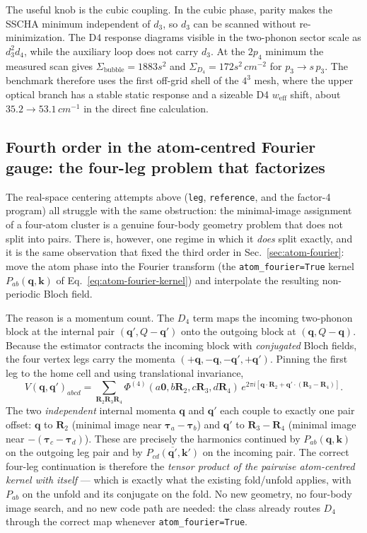 \documentclass[11pt,a4paper]{article}
\newcommand{\qv}{\mathbf{q}}
\newcommand{\kv}{\mathbf{k}}
\newcommand{\Rv}{\mathbf{R}}
\begin{document}
The useful knob is the cubic coupling.  In the cubic phase, parity makes
the SSCHA minimum independent of $d_3$, so $d_3$ can be scanned without
re-minimization.  The D4 response diagrams visible in the two-phonon sector
scale as $d_3^2d_4$, while the auxiliary loop does not carry $d_3$.  At the
$2p_4$ minimum the measured scan gives
$\Sigma_{\mathrm{bubble}}=1883s^2$ and
$\Sigma_{D_4}=172s^2\,\si{cm^{-2}}$ for $p_3\to s\,p_3$.  The benchmark
therefore uses the first off-grid shell of the $4^3$ mesh, where the upper
optical branch has a stable static response and a sizeable D4
$w_{\mathrm{eff}}$ shift, about $35.2\to53.1\,\si{cm^{-1}}$ in the direct
fine calculation.

\subsection{Fourth order in the atom-centred Fourier gauge: the four-leg
problem that factorizes}
\label{sec:d4-atom-fourier}

The real-space centering attempts above (\texttt{leg}, \texttt{reference},
and the factor-4 program) all struggle with the same obstruction: the
minimal-image assignment of a four-atom cluster is a genuine four-body
geometry problem that does not split into pairs.  There is, however, one
regime in which it \emph{does} split exactly, and it is the same
observation that fixed the third order in Sec.~\ref{sec:atom-fourier}:
move the atom phase into the Fourier transform (the
\texttt{atom\_fourier=True} kernel $P_{ab}(\qv,\kv)$ of
Eq.~\eqref{eq:atom-fourier-kernel}) and interpolate the resulting
non-periodic Bloch field.

The reason is a momentum count.  The $D_4$ term maps the incoming
two-phonon block at the internal pair $(\qv',Q-\qv')$ onto the outgoing
block at $(\qv,Q-\qv)$.  Because the estimator contracts the incoming
block with \emph{conjugated} Bloch fields, the four vertex legs carry the
momenta $(+\qv,-\qv,-\qv',+\qv')$.  Pinning the first leg to the home cell
and using translational invariance,
\begin{equation}
V(\qv,\qv')_{abcd}
= \sum_{\Rv_2\Rv_3\Rv_4}
\Phi^{(4)}(a\mathbf 0,b\Rv_2,c\Rv_3,d\Rv_4)\,
e^{2\pi i[\qv\cdot\Rv_2+\qv'\cdot(\Rv_3-\Rv_4)]} .
\label{eq:d4-two-momenta}
\end{equation}
The two \emph{independent} internal momenta $\qv$ and $\qv'$ each couple to
exactly one pair offset: $\qv$ to $\Rv_2$ (minimal image near
$\boldsymbol\tau_a-\boldsymbol\tau_b$) and $\qv'$ to $\Rv_3-\Rv_4$
(minimal image near
$-(\boldsymbol\tau_c-\boldsymbol\tau_d)$).  These are precisely the harmonics continued by
$P_{ab}(\qv,\kv)$ on the outgoing leg pair and by
$\overline{P_{cd}(\qv',\kv')}$ on the incoming pair.  The correct four-leg
continuation is therefore the \emph{tensor product of the pairwise
atom-centred kernel with itself} --- which is exactly what the existing
fold/unfold applies, with $P_{ab}$ on the unfold and its conjugate on the
fold.  No new geometry, no four-body image search, and no new code path are
needed: the class already routes $D_4$ through the correct map whenever
\texttt{atom\_fourier=True}.
\end{document}
